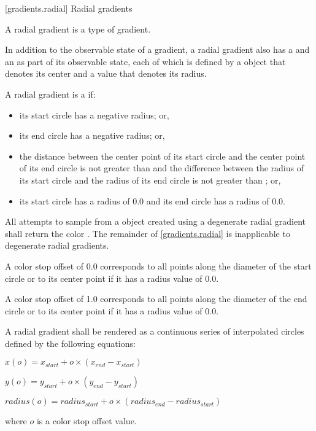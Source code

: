  [gradients.radial] {Radial gradients}

\pnum
A radial gradient is a type of gradient.

\pnum
In addition to the observable state of a gradient, a radial gradient also has a  and an  as part of its observable state, each of which is defined by a  object that denotes its center and a  value that denotes its radius.

\pnum
A radial gradient is a  if:
\begin{itemize}
\item its start circle has a negative radius; or,
\item its end circle has a negative radius; or,
\item the distance between the center point of its start circle and the center point of its end circle is not greater than  and the difference between the radius of its start circle and the radius of its end circle is not greater than ; or,
\item its start circle has a radius of 0.0 and its end circle has a radius of 0.0.
\end{itemize}

\pnum
All attempts to sample from a  object created using a degenerate radial gradient shall return the color . The remainder of \ref{gradients.radial} is inapplicable to degenerate radial gradients.

\pnum
A color stop offset of 0.0 corresponds to all points along the diameter of the start circle or to its center point if it has a radius value of 0.0.

\pnum
A color stop offset of 1.0 corresponds to all points along the diameter of the end circle or to its center point if it has a radius value of 0.0.

\pnum
A radial gradient shall be rendered as a continuous series of interpolated circles defined by the following equations:
\begin{enumeratea}
\item $x(o) = x_{start} + o \times (x_{end} - x_{start})$
\item $y(o) = y_{start} + o \times (y_{end} - y_{start})$
\item $radius(o) = radius_{start} + o \times (radius_{end} - radius_{start})$
\end{enumeratea}
where $o$ is a color stop offset value.

